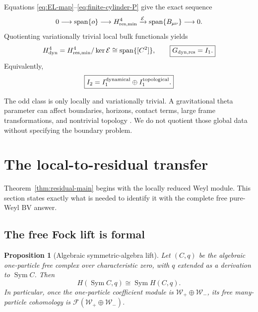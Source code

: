\documentclass[11pt]{article}
\newtheorem{proposition}[theorem]{Proposition}
\theoremstyle{definition}
\theoremstyle{remark}
\newcommand{\W}{\mathcal W}
\newcommand{\F}{\mathcal F}
\newcommand{\cE}{\mathcal E}
\begin{document}
Equations \eqref{eq:EL-map}--\eqref{eq:finite-cylinder-P} give the exact
sequence
\begin{equation}\label{eq:EL-exact-sequence}
 0\longrightarrow\operatorname{span}\{o\}
 \longrightarrow H^4_{\rm res,min}
 \xrightarrow{\cE}\operatorname{span}\{B_{\mu\nu}\}
 \longrightarrow0.
\end{equation}
Quotienting variationally trivial local bulk functionals yields
\begin{equation}\label{eq:dynamic-quotient}
 H^4_{\rm dyn}
 =H^4_{\rm res,min}/\ker\cE
 \cong\operatorname{span}\{[C^2]\},
 \qquad
 \boxed{G_{\rm dyn,res}=I_1.}
\end{equation}
Equivalently,
\begin{equation}\label{eq:I2-split}
 \boxed{I_2=I_1^{\rm dynamical}\oplus I_1^{\rm topological}.}
\end{equation}

The odd class is only locally and variationally trivial.  A gravitational
theta parameter can affect boundaries, horizons, contact terms, large frame
transformations, and nontrivial topology \cite{FischlerKundu}.  We do not
quotient those global data without specifying the boundary problem.

\section{The local-to-residual transfer}\label{sec:transfer}

Theorem~\ref{thm:residual-main} begins with the locally reduced Weyl module.
This section states exactly what is needed to identify it with the complete
free pure-Weyl BV answer.

\subsection{The free Fock lift is formal}

\begin{proposition}[Algebraic symmetric-algebra lift]
\label{prop:Fock-lift}
Let $(C,q)$ be the algebraic one-particle free complex over characteristic
zero, with $q$ extended as a derivation to $\operatorname{Sym}C$.  Then
\begin{equation}\label{eq:Fock-lift}
 \boxed{
 H(\operatorname{Sym}C,q)
 \cong\operatorname{Sym}H(C,q).}
\end{equation}
In particular, once the one-particle coefficient module is
$\W_+\oplus\W_-$, its free many-particle cohomology is
$\F(\W_+\oplus\W_-)$.
\end{proposition}
\end{document}
